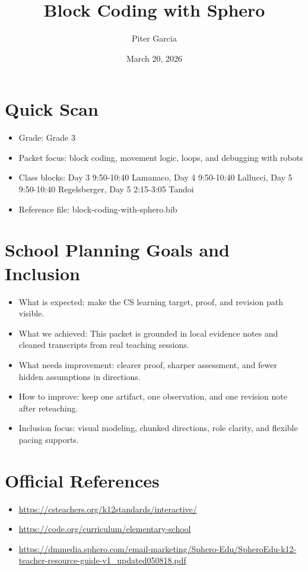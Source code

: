 \documentclass[11pt]{article}
\title{Block Coding with Sphero}
\author{Piter Garcia}
\date{March 20, 2026}
\begin{document}
\maketitle
\section*{Quick Scan}
\begin{itemize}[leftmargin=*]
\item Grade: Grade 3
\item Packet focus: block coding, movement logic, loops, and debugging with robots
\item Class blocks: Day 3 9:50-10:40 Lamanaco, Day 4 9:50-10:40 Lallucci, Day 5 9:50-10:40 Regelsberger, Day 5 2:15-3:05 Tandoi
\item Reference file: block-coding-with-sphero.bib
\end{itemize}
\section*{School Planning Goals and Inclusion}
\begin{itemize}[leftmargin=*]
\item What is expected: make the CS learning target, proof, and revision path visible.
\item What we achieved: This packet is grounded in local evidence notes and cleaned transcripts from real teaching sessions.
\item What needs improvement: clearer proof, sharper assessment, and fewer hidden assumptions in directions.
\item How to improve: keep one artifact, one observation, and one revision note after reteaching.
\item Inclusion focus: visual modeling, chunked directions, role clarity, and flexible pacing supports.
\end{itemize}
\section*{Official References}
\begin{itemize}[leftmargin=*]
\item \url{https://csteachers.org/k12standards/interactive/}
\item \url{https://code.org/curriculum/elementary-school}
\item \url{https://dmmedia.sphero.com/email-marketing/Sphero-Edu/SpheroEdu-k12-teacher-resource-guide-v1_updated050818.pdf}
\end{itemize}
\end{document}

